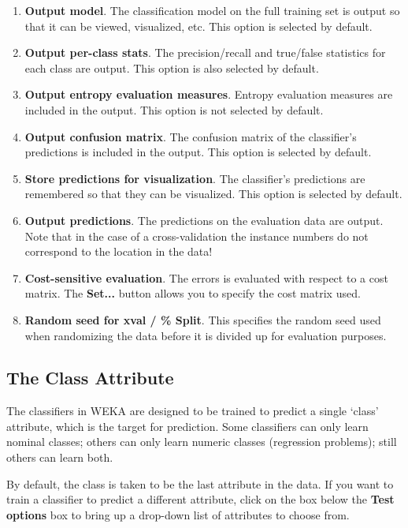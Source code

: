\documentclass[a4paper]{article}
\begin{document}
\begin{enumerate}
\item \textbf{Output model}.
The classification model on the full training set is output so that it can be
viewed, visualized, etc. This option is selected by default.
\item \textbf{Output per-class stats}.  The precision/recall and
true/false statistics for each class are output. This option is also
selected by default.
\item \textbf{Output entropy evaluation measures}.  Entropy evaluation
measures are included in the output. This option is not selected by
default.
\item \textbf{Output confusion matrix}.
The confusion matrix of the classifier's predictions is included in the output. This option is selected by default.
\item \textbf{Store predictions for visualization}.  The classifier's
predictions are remembered so that they can be visualized. This option
is selected by default.
\item \textbf{Output predictions}. The predictions on the evaluation
data are output.  Note that in the case of a cross-validation the
instance numbers do not correspond to the location in the data!
\item \textbf{Cost-sensitive evaluation}.
The errors is evaluated with respect to a cost matrix. The \textbf{Set...}
button allows you to specify the cost matrix used. 
\item \textbf{Random seed for xval / \% Split}.
This specifies the random seed used when randomizing the data before it is
divided up for evaluation purposes.
\end{enumerate}

\subsection{The Class Attribute}

The classifiers in WEKA are designed to be trained to predict a single `class'
attribute, which is the target for prediction. Some classifiers can only learn
nominal classes; others can only learn numeric classes (regression problems);
still others can learn both.

By default, the class is taken to be the last attribute in the data.  If you
want to train a classifier to predict a different attribute, click on the box
below the \textbf{Test options} box to bring up a drop-down list of attributes
to choose from.
\end{document}
